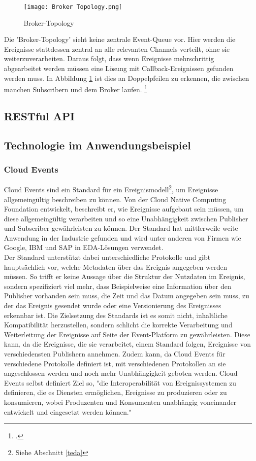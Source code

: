 \begin{figure}[H]
  \centering
  \texttt{[image: Broker Topology.png]}
  \caption[Broker-Topology]{Broker-Topology \footnotemark}
  \label{brokertop}
\end{figure}
Die 'Broker-Topology' sieht keine zentrale Event-Queue vor. Hier werden die Ereignisse stattdessen zentral an alle relevanten Channels verteilt, ohne sie weiterzuverarbeiten. Daraus folgt, dass wenn Ereignisse mehrschrittig abgearbeitet werden müssen eine Lösung mit Callback-Ereignissen gefunden werden muss. In Abbildung \ref{brokertop} ist dies an Doppelpfeilen zu erkennen, die zwischen manchen Subscribern und dem Broker laufen. \footcite[Vgl. ][]{wickramarachchi_2017_event}

\subsection{RESTful \ac{API}}
\subsection{Technologie im Anwendungsbeispiel}

\subsubsection*{Cloud Events}
Cloud Events sind ein Standard für ein Ereignismodell\footnote{Siehe Abschnitt \ref*{teda}}, um Ereignisse allgemeingültig beschreiben zu können. Von der Cloud Native Computing Foundation entwickelt, beschreibt er, wie Ereignisse aufgebaut sein müssen, um diese allgemeingültig verarbeiten und so eine Unabhängigkeit zwischen Publisher und Subscriber gewährleisten zu können. Der Standard hat mittlerweile weite Anwendung in der Industrie gefunden und wird unter anderen von Firmen wie Google, IBM und SAP in \ac{EDA}-Lösungen verwendet. \citepls \\
Der Standard unterstützt dabei unterschiedliche Protokolle und gibt hauptsächlich vor, welche Metadaten über das Ereignis angegeben werden müssen. So trifft er keine Aussage über die Struktur der Nutzdaten im Ereignis, sondern spezifiziert viel mehr, dass Beispielweise eine Information über den Publisher vorhanden sein muss, die Zeit und das Datum angegeben sein muss, zu der das Ereignis gesendet wurde oder eine Versionierung des Ereignisses erkennbar ist. Die Zielsetzung des Standards ist es somit nicht, inhaltliche Kompatibilität herzustellen, sondern schlicht die korrekte Verarbeitung und Weiterleitung der Ereignisse auf Seite der Event-Platform zu gewährleisten. Diese kann, da die Ereignisse, die sie verarbeitet, einem Standard folgen, Ereignisse von verschiedensten Publishern annehmen. Zudem kann, da Cloud Events für verschiedene Protokolle definiert ist, mit verschiedenen Protokollen an sie angeschlossen werden und noch mehr Unabhängigkeit geboten werden. Cloud Events selbst definiert Ziel so, "die Interoperabilität von Ereignissystemen zu definieren, die es Diensten ermöglichen, Ereignisse zu produzieren oder zu konsumieren, wobei Produzenten und Konsumenten unabhängig voneinander entwickelt und eingesetzt werden können."\citepls

